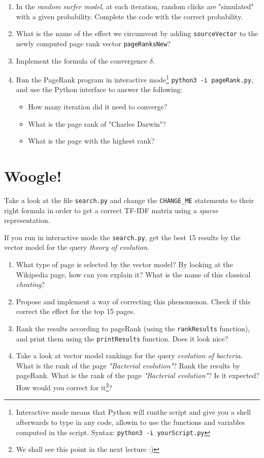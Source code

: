 \documentclass[mathserif, 11pt,c]{article}
\begin{document}
\begin{enumerate}[label=\textbf{Q\thesection.\arabic*}]
	\item In the \textit{random surfer model}, at each iteration, random clicks are "simulated" with a given probability. Complete the code with the correct probability.
	\item What is the name of the effect we circumvent by adding \texttt{sourceVector} to the newly computed page rank vector \texttt{pageRanksNew}?
	\item Implement the formula of the convergence $\delta$.
	\item Run the PageRank program in interactive mode\footnote{Interactive mode means that Python will runthe script and give you a shell afterwards to type in any code, allowin to use the functions and variables computed in the script. Syntax: \texttt{python3 -i yourScript.py}} \texttt{python3 -i pageRank.py}, and use the Python interface to answer the following:
	\begin{itemize}
		\item How many iteration did it need to converge?
		\item What is the page rank of "Charles Darwin"?
		\item What is the page with the highest rank?
	\end{itemize}
\end{enumerate}

\section{Woogle!}


Take a look at the file \texttt{search.py} and change the \texttt{CHANGE\_ME} statements to their right formula in order to get a correct TF-IDF matrix using a \textit{sparse }representation.

If you run in interactive mode the \texttt{search.py}, get the best 15 results by the vector model for the query \textit{theory of evolution}.

\begin{enumerate}[label=\textbf{Q\thesection.\arabic*}]
	\item What type of page is selected by the vector model? By looking at the Wikipedia page, how can you explain it? What is the name of this classical \textit{cheating}?
	\item Propose and implement a way of correcting this phenomenon. Check if this correct the effect for the top 15 pages.
	\item Rank the results according to pageRank (using the \texttt{rankResults} function), and print them using the \texttt{printResults} function. Does it look nice?
	\item Take a look at vector model rankings for the query \textit{evolution of bacteria}. What is the rank of the page \textit{"Bacterial evolution"}? Rank the results by pageRank. What is the rank of the page \textit{"Bacterial evolution"}? Is it expected? How would you correct for it\footnote{We shall see this point in the next lecture :)}?
\end{enumerate}
\end{document}
